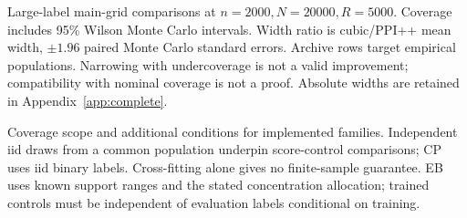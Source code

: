 \begin{table}[ht]
\caption{Large-label main-grid comparisons at $n=2000,N=20000,R=5000$. Coverage includes 95\% Wilson Monte Carlo intervals. Width ratio is cubic/PPI++ mean width, $\pm1.96$ paired Monte Carlo standard errors. Archive rows target empirical populations. Narrowing with undercoverage is not a valid improvement; compatibility with nominal coverage is not a proof. Absolute widths are retained in Appendix~\ref{app:complete}.}
\centering
\label{tab:main}
\end{table}

\begin{table}[ht]
\caption{Coverage scope and additional conditions for implemented families. Independent iid draws from a common population underpin score-control comparisons; CP uses iid binary labels. Cross-fitting alone gives no finite-sample guarantee. EB uses known support ranges and the stated concentration allocation; trained controls must be independent of evaluation labels conditional on training.}
\centering
\label{tab:assumptions}
\end{table}

